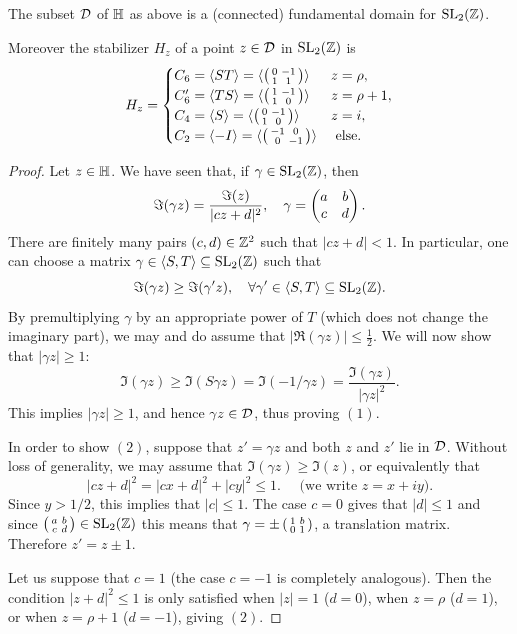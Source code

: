 \begin{theorem}
  The subset $\mathcal{D}$ of $\mathbb{H}$ as above is a (connected) fundamental domain for $\operatorname{SL}_2(\mathbb{Z})$.

Moreover the stabilizer $H_z$ of a point $z\in\mathcal{D}$ in $\operatorname{SL}_2(\mathbb{Z})$ is
\[
H_z=\begin{cases}
C_6=\langle ST\rangle = \langle\left(\begin{smallmatrix}0&-1\\1&1\end{smallmatrix}\right)\rangle  & z = \rho,\\
C_6'=\langle TS\rangle =\langle \left(\begin{smallmatrix}1&-1\\1&0\end{smallmatrix}\right)\rangle & z=\rho + 1,\\
C_4=\langle S\rangle =\langle \left(\begin{smallmatrix}0&-1\\1&0\end{smallmatrix}\right)\rangle & z=i,\\
C_2=\langle -I\rangle =\langle \left(\begin{smallmatrix}-1&0\\0&-1\end{smallmatrix}\right)\rangle&\text{ else.}
\end{cases}
\]
\end{theorem}
\begin{proof}
  Let $z\in \mathbb{H}$. We have seen that, if $\gamma\in\operatorname{SL}_2(\mathbb{Z})$, then
\[
\Im(\gamma z) = \frac{\Im(z)}{|cz+d|^2},\quad \gamma = \left(\begin{matrix}a&b\\c&d\end{matrix}\right).
\]
There are finitely many pairs $(c,d)\in\mathbb{Z}^2$ such that $|cz+d|<1$. In particular,
one can choose a matrix $\gamma\in\langle S,T\rangle\subseteq \operatorname{SL}_2(\mathbb{Z})$ such that
\[
\Im(\gamma z)\geq \Im(\gamma' z),\quad \forall \gamma'\in \langle S,T\rangle\subseteq\operatorname{SL}_2(\mathbb{Z}).
\]
By premultiplying $\gamma$ by an appropriate power of $T$ (which does not change the imaginary part), we may and do assume that $|\Re(\gamma z)|\leq \frac 12$. We will now show that $|\gamma z|\geq 1$:
\[
\Im(\gamma z)\geq \Im(S\gamma z)=\Im(-1/\gamma z)=\frac{\Im(\gamma z)}{|\gamma z|^2}.
\]
This implies $|\gamma z|\geq 1$, and hence $\gamma z\in \mathcal{D}$, thus proving $(1)$.

In order to show $(2)$, suppose that $z'=\gamma z$ and both $z$ and $z'$ lie in $\mathcal{D}$. Without loss of
generality, we may assume that $\Im(\gamma z)\geq \Im(z)$, or equivalently that
\[
|cz+d|^2=|cx+d|^2+|cy|^2\leq 1.\quad\text{ (we write $z=x+iy$).}
\]
Since $y>1/2$, this implies that $|c|\leq 1$. The case $c=0$ gives that $|d|\leq 1$ and since $\left(\begin{smallmatrix}a&b\\c&d\end{smallmatrix}\right)\in\operatorname{SL}_2(\mathbb{Z})$ this means that $\gamma=\pm\left(\begin{smallmatrix}1&b\\0&1\end{smallmatrix}\right)$, a translation matrix. Therefore $z'=z\pm 1$.

Let us suppose that $c=1$ (the case $c=-1$ is completely analogous). Then the condition $|z+d|^2\leq 1$ is only satisfied when $|z|=1$ ($d=0$), when $z=\rho$ ($d=1$), or when $z=\rho+1$ ($d=-1$), giving $(2)$.


\end{proof}
